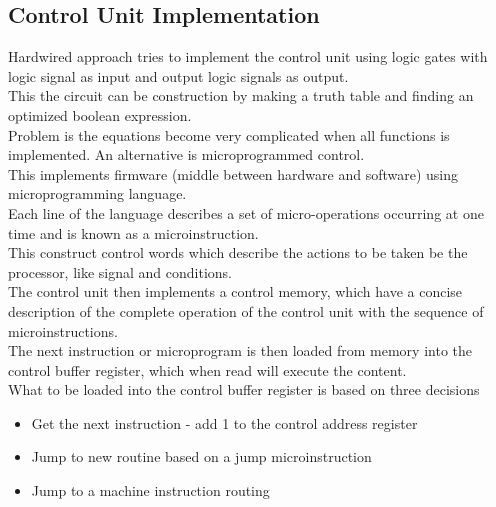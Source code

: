 \documentclass[12pt, a4paper]{article}
\begin{document}
		\subsection{Control Unit Implementation}
			Hardwired approach tries to implement the control unit using logic gates with logic signal as input and output logic signals as output.\\
			This the circuit can be construction by making a truth table and finding an optimized boolean expression.\\
			Problem is the equations become very complicated when all functions is implemented.
			An alternative is microprogrammed control.\\
			This implements firmware (middle between hardware and software) using microprogramming language.\\
			Each line of the language describes a set of micro-operations occurring at one time and is known as a microinstruction.\\
			This construct control words which describe the actions to be taken be the processor, like signal and conditions.\\
			The control unit then implements a control memory, which have a concise description of the complete operation of the control unit with the sequence of microinstructions.\\
			The next instruction or microprogram is then loaded from memory into the control buffer register, which when read will execute the content.\\
			What to be loaded into the control buffer register is based on three decisions
			\begin{itemize}
				\item Get the next instruction - add 1 to the control address register
				\item Jump to new routine based on a jump microinstruction
				\item Jump to a machine instruction routing
			\end{itemize}
\end{document}
